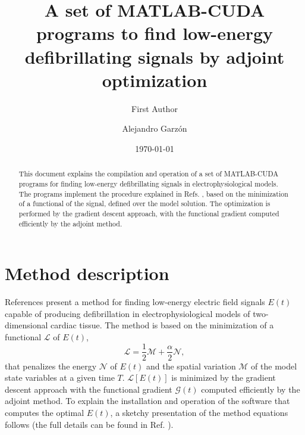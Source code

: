 \documentclass{article}
\begin{document}

\title{A set of MATLAB-CUDA programs to find low-energy defibrillating signals by adjoint optimization}
\author{First Author}
\author{Alejandro Garz\'on}%

\date{\today}%

\maketitle
\begin{abstract}
  This document explains the compilation and operation of a set of MATLAB-CUDA programs for finding low-energy defibrillating signals in electrophysiological models. The programs implement the procedure explained in Refs. \cite{garzon2024ultra,garzon2024chaos}, based on the minimization of a functional of the signal, defined over the model solution. The optimization is performed by the gradient descent approach, with the functional gradient computed efficiently by the adjoint method.
\end{abstract}


\section{Method description}
References \cite{garzon2024ultra,garzon2024chaos} present a method for finding low-energy electric field signals $E(t)$ capable of producing defibrillation in electrophysiological models of two-dimensional cardiac tissue. The method is based on the minimization of a functional $\mathcal{L}$ of $E(t)$,
\begin{equation}
  \label{eq:LNM}
      \mathcal{L} = \frac{1}{2}\mathcal{M} + \frac{\alpha}{2}\mathcal{N},
\end{equation}
that penalizes the energy $\mathcal{N}$ of $E(t)$ and the spatial variation $\mathcal{M}$ of the model state variables at a given time $T$. $\mathcal{L}[E(t)]$ is minimized by the gradient descent approach with the functional gradient $\mathcal{G}(t)$ computed efficiently by the adjoint method. To explain the installation and operation of the software that computes the optimal $E(t)$, a sketchy presentation of the method equations follows (the full details can be found in Ref. \cite{garzon2024ultra}).
\end{document}
